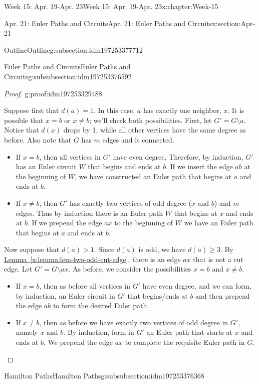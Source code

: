 \documentclass[oneside,10pt,]{book}
\newcommand{\xreffont}{\relax}
\numberwithin{equation}{section}
\renewcommand{\ge}{\geqslant}
\newcommand{\gt}{>}
\begin{document}
\begin{chapterptx}{Week 15: Apr. 19-Apr. 23}{}{Week 15: Apr. 19-Apr. 23}{}{}{x:chapter:Week-15}
\begin{sectionptx}{Apr. 21: Euler Paths and Circuits}{}{Apr. 21: Euler Paths and Circuits}{}{}{x:section:Apr-21}
\begin{subsectionptx}{Outline}{}{Outline}{}{}{g:subsection:idm197253377712}
\begin{subsubsectionptx}{Euler Paths and Circuits}{}{Euler Paths and Circuits}{}{}{g:subsubsection:idm197253376592}
\begin{proof}{}{g:proof:idm197253329488}
\par
Suppose first that \(d(a) = 1\). In this case, \(a\) has exactly one neighbor, \(x\). It is possible that \(x = b\) or \(x\ne b\); we'll check both possibilities. First, let \(G' = G\setminus a\). Notice that \(d(x)\) drops by 1, while all other vertices have the same degree as before. Also note that \(G\) has \(m\) edges and is connected.%
%
\begin{itemize}[label=\textbullet]
\item{}If \(x=b\), then all vertices in \(G'\) have even degree. Therefore, by induction, \(G'\) has an Euler circuit \(W\) that begins and ends at \(b\). If we insert the edge \(ab\) at the beginning of \(W\), we have constructed an Euler path that begins at \(a\) and ends at \(b\).%
\item{}If \(x\ne b\), then \(G'\) has exactly two vertices of odd degree (\(x\) and \(b\)) and \(m\) edges. Thus by induction there is an Euler path \(W\) that begins at \(x\) and ends at \(b\). If we prepend the edge \(ax\) to the beginning of \(W\) we have an Euler path that begins at \(a\) and ends at \(b\).%
\end{itemize}
Now suppose that \(d(a) \gt 1\). Since \(d(a)\) is odd, we have \(d(a) \ge 3\). By \hyperref[x:lemma:lem-two-odd-cut-edge]{Lemma~{\xreffont\ref{x:lemma:lem-two-odd-cut-edge}}}, there is an edge \(ax\) that is not a cut edge. Let \(G' = G\setminus ax\). As before, we consider the possibilities \(x = b\) and \(x\ne b\).%
%
\begin{itemize}[label=\textbullet]
\item{}If \(x=b\), then as before all vertices in \(G'\) have even degree, and we can form, by induction, an Euler circuit in \(G'\) that begins\slash{}ends at \(b\) and then prepend the edge \(ab\) to form the desired Euler path.%
\item{}If \(x\ne b\), then as before we have exactly two vertices of odd degree in \(G'\), namely \(x\) and \(b\). By induction, form in \(G'\) an Euler path that starts at \(x\) and ends at \(b\). We prepend the edge \(ax\) to complete the requisite Euler path in \(G\).%
\end{itemize}
\end{proof}
\end{subsubsectionptx}
%
%
\typeout{************************************************}
\typeout{************************************************}
%
\begin{subsubsectionptx}{Hamilton Paths}{}{Hamilton Paths}{}{}{g:subsubsection:idm197253376368}

\end{subsubsectionptx}
\end{subsectionptx}
\end{sectionptx}
\end{chapterptx}
\end{document}
